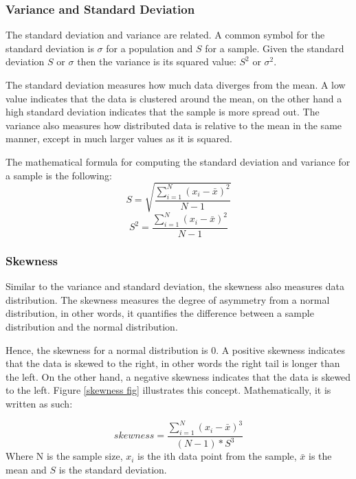 \subsubsection{Variance and Standard Deviation}

The standard deviation and variance are related. A common symbol for the standard deviation is $\sigma$ for a population and $S$ for a sample. Given the standard deviation $S$ or $\sigma$ then the variance is its squared value: $S^{2}$ or $\sigma^{2}$.

The standard deviation measures how much data diverges from the mean. A low value indicates that the data is clustered around the mean, on the other hand a high standard deviation indicates that the sample is more spread out. The variance also measures how distributed data is relative to the mean in the same manner, except in much larger values as it is squared.

The mathematical formula for computing the standard deviation and variance for a sample is the following:
\begin{equation}
    S = \sqrt{\frac{\sum_{i=1}^{N}(x_{i} - \bar{x})^{2}}{N - 1}}
\end{equation}
\begin{equation}
    S^2 = \frac{\sum_{i=1}^{N}(x_{i} - \bar{x})^{2}}{N - 1}
\end{equation}

\subsubsection{Skewness}

Similar to the variance and standard deviation, the skewness also measures data distribution. The skewness measures the degree of asymmetry from a normal distribution, in other words, it quantifies the difference between a sample distribution and the normal distribution.

Hence, the skewness for a normal distribution is 0. A positive skewness indicates that the data is skewed to the right, in other words the right tail is longer than the left. On the other hand, a negative skewness indicates that the data is skewed to the left. Figure \ref{skewness fig} illustrates this concept. Mathematically, it is written as such:

\begin{equation}
    skewness = \frac{\sum_{i=1}^{N}(x_{i} - \bar{x})^{3}}{(N - 1) * S^{3}}
\end{equation}
Where N is the sample size, $x_{i}$ is the ith data point from the sample, $\bar{x}$ is the mean and $S$ is the standard deviation.


